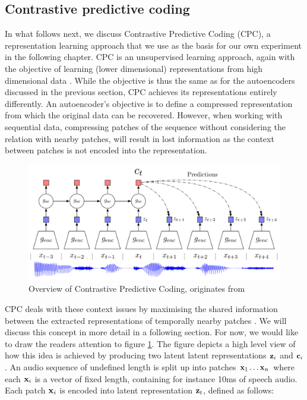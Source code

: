 \subsection{Contrastive predictive coding}


	In what follows next, we discuss Contrastive Predictive Coding (CPC), a representation learning approach that we use as the basis for our own experiment in the following chapter.
	CPC is an unsupervised learning approach, again with the objective of learning (lower dimensional) representations from high dimensional data \cite{oordRepresentationLearningContrastive2019}. While the objective is thus the same as for the autoencoders discussed in the previous section, CPC achieves its representations entirely differently. An autoencoder's objective is to define a compressed representation from which the original data can be recovered. However, when working with sequential data, compressing patches of the sequence without considering the relation with nearby patches, will result in lost information as the context between patches is not encoded into the representation. %


\begin{figure}[h] %
	\centering
	\includegraphics[width=0.7\linewidth]{"cpc overview"}
	\caption{Overview of Contrastive Predictive Coding, originates from \cite{oordRepresentationLearningContrastive2019}}
	\label{fig:cpc-overview}
\end{figure}

	CPC deals with these context issues by maximising the shared information between the extracted representations of temporally nearby patches \cite{lowePuttingEndEndtoEnd2020}. We will discuss this concept in more detail in a following section. For now, we would like to draw the readers attention to figure \ref{fig:cpc-overview}. The figure depicts a high level view of how this idea is achieved by producing two latent latent representations $\mathbf{z}_i$ and $\mathbf{c}_i$. An audio sequence of undefined length is split up into patches $\mathbf{x}_1 \dots \mathbf{x}_n$ where each $\mathbf{x}_i$ is a vector of fixed length, containing for instance 10ms of speech audio. Each patch $\mathbf{x}_i$ is encoded into latent representation $\mathbf{z}_t$, defined as follows:
	
